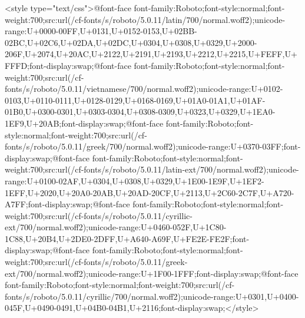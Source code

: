 <style type="text/css">@font-face {font-family:Roboto;font-style:normal;font-weight:700;src:url(/cf-fonts/s/roboto/5.0.11/latin/700/normal.woff2);unicode-range:U+0000-00FF,U+0131,U+0152-0153,U+02BB-02BC,U+02C6,U+02DA,U+02DC,U+0304,U+0308,U+0329,U+2000-206F,U+2074,U+20AC,U+2122,U+2191,U+2193,U+2212,U+2215,U+FEFF,U+FFFD;font-display:swap;}@font-face {font-family:Roboto;font-style:normal;font-weight:700;src:url(/cf-fonts/s/roboto/5.0.11/vietnamese/700/normal.woff2);unicode-range:U+0102-0103,U+0110-0111,U+0128-0129,U+0168-0169,U+01A0-01A1,U+01AF-01B0,U+0300-0301,U+0303-0304,U+0308-0309,U+0323,U+0329,U+1EA0-1EF9,U+20AB;font-display:swap;}@font-face {font-family:Roboto;font-style:normal;font-weight:700;src:url(/cf-fonts/s/roboto/5.0.11/greek/700/normal.woff2);unicode-range:U+0370-03FF;font-display:swap;}@font-face {font-family:Roboto;font-style:normal;font-weight:700;src:url(/cf-fonts/s/roboto/5.0.11/latin-ext/700/normal.woff2);unicode-range:U+0100-02AF,U+0304,U+0308,U+0329,U+1E00-1E9F,U+1EF2-1EFF,U+2020,U+20A0-20AB,U+20AD-20CF,U+2113,U+2C60-2C7F,U+A720-A7FF;font-display:swap;}@font-face {font-family:Roboto;font-style:normal;font-weight:700;src:url(/cf-fonts/s/roboto/5.0.11/cyrillic-ext/700/normal.woff2);unicode-range:U+0460-052F,U+1C80-1C88,U+20B4,U+2DE0-2DFF,U+A640-A69F,U+FE2E-FE2F;font-display:swap;}@font-face {font-family:Roboto;font-style:normal;font-weight:700;src:url(/cf-fonts/s/roboto/5.0.11/greek-ext/700/normal.woff2);unicode-range:U+1F00-1FFF;font-display:swap;}@font-face {font-family:Roboto;font-style:normal;font-weight:700;src:url(/cf-fonts/s/roboto/5.0.11/cyrillic/700/normal.woff2);unicode-range:U+0301,U+0400-045F,U+0490-0491,U+04B0-04B1,U+2116;font-display:swap;}</style>
